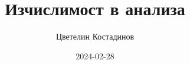 \newif\ifnotes

\notestrue
\title{Изчислимост в анализа}

\ifnotes
    \date{2024-02-28}
\else 
    \title{Изчислимост в анализа - домашни работи}
    \date{\today}
\fi

\author{
  Цветелин Костадинов
}